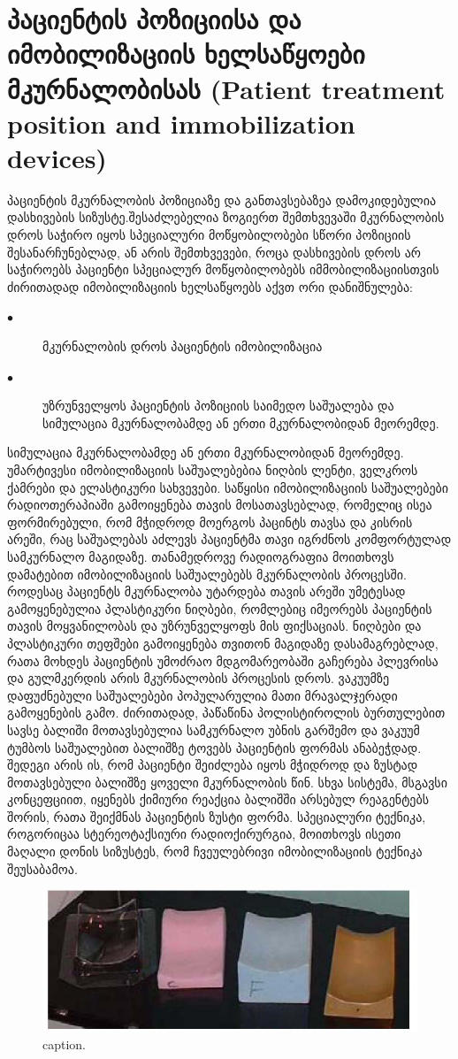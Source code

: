 \documentclass[12pt,a4paper,]{report}
\begin{document}
\chapter{პაციენტის პოზიციისა და იმობილიზაციის ხელსაწყოები მკურნალობისას (Patient treatment position and immobilization devices)}
პაციენტის მკურნალობის პოზიციაზე და განთავსებაზეა დამოკიდებულია დასხივების სიზუსტე.შესაძლებელია ზოგიერთ შემთხვევაში მკურნალობის დროს საჭირო იყოს სპეციალური მოწყობილობები სწორი პოზიციის შესანარჩუნებლად, ან არის შემთხვევები, როცა დასხივების დროს არ საჭიროებს პაციენტი სპეციალურ მოწყობილობებს იმმობილიზაციისთვის
ძირითადად იმობილიზაციის ხელსაწყოებს აქვთ ორი დანიშნულება:
	\begin{description}
      \item[$\bullet$] მკურნალობის დროს პაციენტის იმობილიზაცია
      \item[$\bullet$] უზრუნველყოს პაციენტის პოზიციის საიმედო საშუალება და სიმულაცია მკურნალობამდე ან ერთი მკურნალობიდან მეორემდე.
    \end{description}
სიმულაცია მკურნალობამდე ან ერთი მკურნალობიდან მეორემდე.
უმარტივესი იმობილიზაციის საშუალებებია ნიღბის ლენტი, ველკროს ქამრები და ელასტიკური სახვევები.  საწყისი იმობილიზაციის საშუალებები რადიოთერაპიაში გამოიყენება თავის მოსათავსებლად, რომელიც ისეა ფორმირებული, რომ მჭიდროდ მოერგოს პაცინტს თავსა და კისრის არეში, რაც საშუალებას აძლევს პაციენტმა თავი იგრძნოს კომფორტულად სამკურნალო მაგიდაზე. თანამედროვე რადიოგრაფია მოითხოვს დამატებით იმობილიზაციის საშუალებებს მკურნალობის პროცესში. როდესაც პაციენტს მკურნალობა უტარდება თავის არეში უმეტესად გამოყენებულია პლასტიკური ნიღბები, რომლებიც იმეორებს პაციენტის თავის მოყვანილობას და უზრუნველყოფს მის ფიქსაციას.
ნიღბები და პლასტიკური თეფშები გამოიყენება თვითონ მაგიდაზე დასამაგრებლად, რათა მოხდეს პაციენტის უმოძრაო მდგომარეობაში გაჩერება პლევრისა და გულმკერდის არის მკურნალობის პროცესის დროს.
ვაკუუმზე დაფუძნებული საშუალებები პოპულარულია მათი მრავალჯერადი გამოყენების გამო. ძირითადად, პაწაწინა პოლისტიროლის ბურთულებით სავსე ბალიში მოთავსებულია სამკურნალო უბნის გარშემო და ვაკუუმ ტუმბოს საშუალებით ბალიშზე ტოვებს პაციენტის ფორმას ანაბეჭდად. შედეგი არის ის, რომ პაციენტი შეიძლება იყოს მჭიდროდ და ზუსტად მოთავსებული ბალიშზე ყოველი მკურნალობის წინ.
სხვა სისტემა, მსგავსი კონცეფციით, იყენებს ქიმიური რეაქცია ბალიშში არსებულ რეაგენტებს შორის, რათა შეიქმნას პაციენტის ზუსტი ფორმა. სპეციალური ტექნიკა, როგორიცაა სტერეოტაქსიური რადიოქირურგია, მოითხოვს ისეთი მაღალი დონის სიზუსტეს, რომ ჩვეულებრივი იმობილიზაციის ტექნიკა შეუსაბამოა.
	\begin{figure}[!h]
	    \centering
        \includegraphics[width = 15cm]{images/ptpaid_01}
        \caption{caption.}
    \end{figure}
\end{document}
